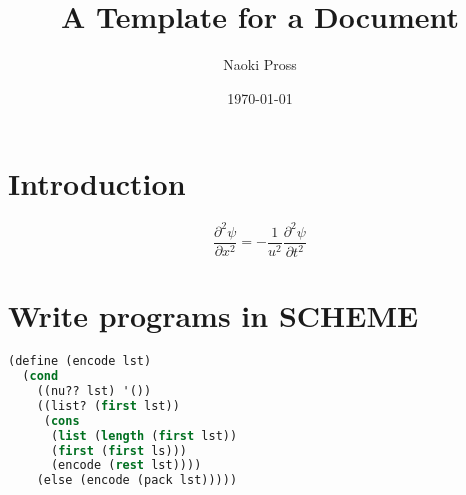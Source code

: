 \documentclass[a4paper, twocolumn]{article}
\title{A Template for a Document}
\author{
  Naoki Pross%
}
\date{\today}
\begin{document}
\maketitle


\tableofcontents

\section{Introduction}
\blindtext
\[
  \frac{\partial^2\psi}{\partial x^2} =
  - \frac{1}{u^2}\frac{\partial^2\psi}{\partial t^2}
\]

\section{Write programs in SCHEME}
\blindtext
\begin{lstlisting}[language=lisp]
(define (encode lst)
  (cond
    ((nu?? lst) '())
    ((list? (first lst))
     (cons
      (list (length (first lst))
      (first (first ls)))
      (encode (rest lst))))
    (else (encode (pack lst)))))
\end{lstlisting}
\blindtext[3]
\end{document}
